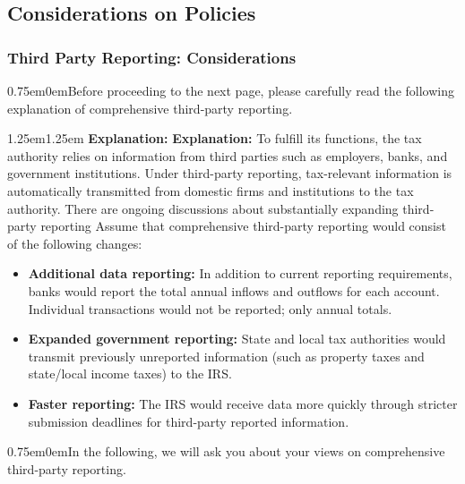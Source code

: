 \documentclass[11pt]{article}
\begin{document}
\subsection*{Considerations on Policies}
\subsubsection*{Third Party Reporting: Considerations}
\begin{adjustwidth}{0.75em}{0em}Before proceeding to the next page, please carefully read the following explanation of comprehensive third-party reporting.\end{adjustwidth} 
\vspace{0.5em}

\begin{adjustwidth}{1.25em}{1.25em}  \textbf{Explanation:}
\textbf{Explanation:} To fulfill its functions, the tax authority relies on information from third parties such as employers, banks, and government institutions. Under third-party reporting, tax-relevant information is automatically transmitted from domestic firms and institutions to the tax authority. There are ongoing discussions about substantially expanding third-party reporting Assume that comprehensive third-party reporting would consist of the following changes:
\begin{itemize}
    \item \textbf{Additional data reporting:} In addition to current reporting requirements, banks would report the total annual inflows and outflows for each account. Individual transactions would not be reported; only annual totals.
    \item \textbf{Expanded government reporting:} State and local tax authorities would transmit previously unreported information (such as property taxes and state/local income taxes) to the IRS.
    \item \textbf{Faster reporting:} The IRS would receive data more quickly through stricter submission deadlines for third-party reported information.
\end{itemize}
\end{adjustwidth}
\begin{adjustwidth}{0.75em}{0em}In the following, we will ask you about your views on comprehensive third-party reporting.\end{adjustwidth} 
\end{document}
